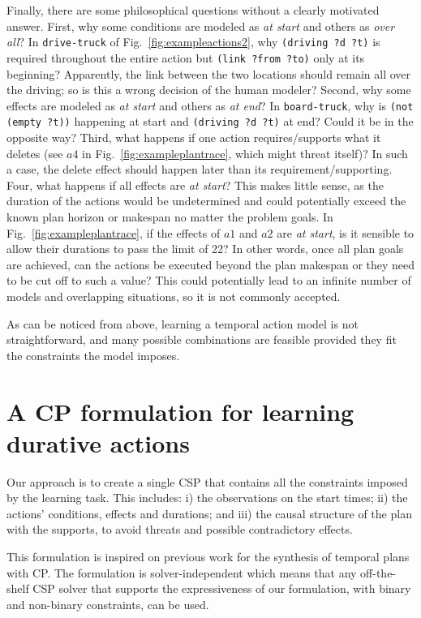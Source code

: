 \documentclass[runningheads]{llncs}
\begin{document}
Finally, there are some philosophical questions without a clearly motivated answer. First, why some conditions are modeled as \emph{at start} and others as \emph{over all}? In \texttt{drive-truck} of Fig.~\ref{fig:exampleactions2}, why \texttt{(driving ?d ?t)} is required throughout the entire action but \texttt{(link ?from ?to)} only at its beginning? Apparently, the link between the two locations should remain all over the driving; so is this a wrong decision of the human modeler?
Second, why some effects are modeled as \emph{at start} and others as \emph{at end}? In \texttt{board-truck}, why is \texttt{(not (empty ?t))} happening at start and \texttt{(driving ?d ?t)} at end? Could it be in the opposite way?
Third, what happens if one action requires/supports what it deletes (see $a4$ in Fig.~\ref{fig:exampleplantrace}, which might threat itself)? In such a case, the delete effect should happen later than its requirement/supporting.
Four, what happens if all effects are \emph{at start}? This makes little sense, as the duration of the actions would be undetermined and could potentially exceed the known plan horizon or makespan no matter the problem goals. In Fig.~\ref{fig:exampleplantrace}, if the effects of $a1$ and $a2$ are \emph{at start}, is it sensible to allow their durations to pass the limit of 22? In other words, once all plan goals are achieved, can the actions be executed beyond the plan makespan or they need to be cut off to such a value? This could potentially lead to an infinite number of models and overlapping situations, so it is not commonly accepted.

As can be noticed from above, learning a temporal action model is not straightforward, and many possible combinations are feasible provided they fit the constraints the model imposes.



\section{A CP formulation for learning durative actions}
\label{sec:CPformulation}

Our approach is to create a single CSP that contains all the constraints imposed by the learning task. This includes: i) the observations on the start times; ii) the actions' conditions, effects and durations; and iii) the causal structure of the plan with the supports, to avoid threats and possible contradictory effects.

This formulation is inspired on previous work for the synthesis of temporal plans with CP\cite{garrido2009constraint}. The formulation is solver-independent which means that any off-the-shelf CSP solver that supports the expressiveness of our formulation, with binary and non-binary constraints, can be used.
\end{document}
